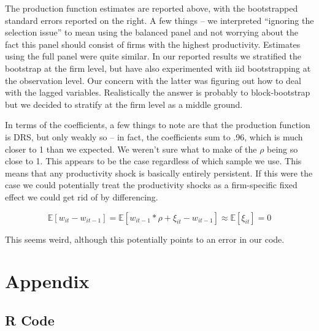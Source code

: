 \documentclass{article}
\newcommand{\E}{\mathbb{E}}
\newcommand{\1}{\mathbbm{1}}
\begin{document}
The production function estimates are reported above, with the bootstrapped standard errors reported on the right. A few things -- we interpreted ``ignoring the selection issue'' to mean using the balanced panel and not worrying about the fact this panel should consist of firms with the highest productivity. Estimates using the full panel were quite similar. In our reported results we stratified the bootstrap at the firm level, but have also experimented with iid bootstrapping at the observation level. Our concern with the latter was figuring out how to deal with the lagged variables. Realistically the answer is probably to block-bootstrap but we decided to stratify at the firm level as a middle ground.

In terms of the coefficients, a few things to note are that the production function is DRS, but only weakly so -- in fact, the coefficients sum to .96, which is much closer to 1 than we expected. We weren't sure what to make of the $\rho$ being so close to 1. This appears to be the case regardless of which sample we use. This means that any productivity shock is basically entirely persistent. If this were the case we could potentially treat the productivity shocks as a firm-specific fixed effect we could get rid of by differencing. 

$$\E[w_{it} - w_{it-1}]= \E[w_{it-1}*\rho +\xi_{it} - w_{it-1}] \approx \E[\xi_{it}] = 0$$

This seems weird, although this potentially points to an error in our code.




\section{Appendix}
\subsection{R Code}


\end{document}
